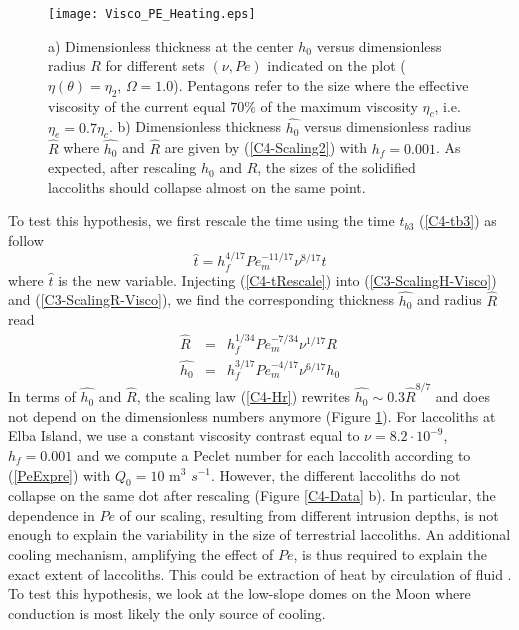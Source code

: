 \begin{figure}[h!]
  \begin{center}
    \graphicspath{ {/Users/thorey/Documents/These/Projet/Refroidissement/Skin_Model/Figure/Figure_Heating/} }
    \texttt{[image: Visco\_PE\_Heating.eps]}
    \caption{a)  Dimensionless thickness  at the  center $h_0$  versus
      dimensionless radius $R$ for different sets $(\nu,Pe)$ indicated
      on  the plot  ($\eta(\theta)=\eta_2$, $\Omega=1.0$).   Pentagons
      refer to the  size where the effective viscosity  of the current
      equal   $70\%$  of   the   maximum   viscosity  $\eta_c$,   i.e.
      $\eta_e=0.7\eta_c$.   b)   Dimensionless  thickness  $\hat{h_0}$
      versus  dimensionless  radius  $\hat{R}$ where  $\hat{h_0}$  and
      $\hat{R}$ are given by (\ref{C4-Scaling2}) with $h_f=0.001$.  As
      expected,  after  rescaling $h_0$  and  $R$,  the sizes  of  the
      solidified  laccoliths  should  collapse   almost  on  the  same
      point. }
    \label{C4-Visco_PE_Heating}
  \end{center}
\end{figure}


To test  this hypothesis,  we first  rescale the  time using  the time
$t_{b3}$ (\ref{C4-tb3}) as follow
\begin{equation}
  \hat{t}= h_f^{4/17} Pe_m^{-11/17}\nu^{8/17}t
  \label{C4-tRescale}
\end{equation}
where  $\hat{t}$ is  the new  variable. Injecting  (\ref{C4-tRescale})
into (\ref{C3-ScalingH-Visco}) and  (\ref{C3-ScalingR-Visco}), we find
the corresponding thickness $\hat{h_0}$ and radius $\hat{R}$ read
\begin{eqnarray}
  \hat{R}&=& h_f^{1/34}Pe_m^{-7/34}\nu^{1/17}R\label{HatR}\\
  \hat{h_0}&=& h_f^{3/17}Pe_m^{-4/17}\nu^{6/17}h_0\label{Hath0}
\end{eqnarray}
In terms of  $\hat{h_0}$ and $\hat{R}$, the  scaling law (\ref{C4-Hr})
rewrites $ \hat{h_0} \sim 0.3\hat{R}^{8/7}$ and does not depend on the
dimensionless numbers anymore  (Figure \ref{C4-Visco_PE_Heating}). For
laccoliths at Elba Island, we  use a constant viscosity contrast equal
to  $\nu =  8.2\cdot 10^{-9}$,  $h_f=0.001$  and we  compute a  Peclet
number for  each laccolith according to  (\ref{PeExpre}) with $Q_0=10$
m$^3$ $s^{-1}$. However,  the different laccoliths do  not collapse on
the same dot after rescaling (Figure \ref{C4-Data} b).  In particular,
the  dependence  in $Pe$  of  our  scaling, resulting  from  different
intrusion depths, is not enough to explain the variability in the size
of   terrestrial  laccoliths.    An   additional  cooling   mechanism,
amplifying the effect  of $Pe$, is thus required to  explain the exact
extent of laccoliths. This could  be extraction of heat by circulation
of fluid \citep{Senger:2014tt}.  To test this hypothesis, we look at
the low-slope  domes on the Moon  where conduction is most  likely the
only source of cooling.

